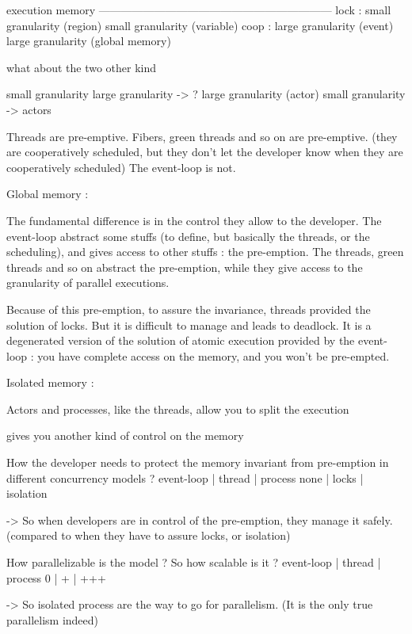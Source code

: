           execution                      memory
        ---------------------------------------------------------------
lock :    small granularity (region)     small granularity (variable)
coop :    large granularity (event)      large granularity (global memory)

what about the two other kind

          small granularity              large granularity     ->    ?
          large granularity (actor)      small granularity     ->  actors




Threads are pre-emptive.
Fibers, green threads and so on are pre-emptive. (they are cooperatively scheduled, but they don't let the developer know when they are cooperatively scheduled)
The event-loop is not.

Global memory :

The fundamental difference is in the control they allow to the developer.
The event-loop abstract some stuffs (to define, but basically the threads, or the scheduling), and gives access to other stuffs : the pre-emption.
The threads, green threads and so on abstract the pre-emption, while they give access to the granularity of parallel executions.

Because of this pre-emption, to assure the invariance, threads provided the solution of locks.
But it is difficult to manage and leads to deadlock.
It is a degenerated version of the solution of atomic execution provided by the event-loop : you have complete access on the memory, and you won't be pre-empted.

Isolated memory :

Actors and processes, like the threads, allow you to split the execution 

 gives you another kind of control on the memory






How the developer needs to protect the memory invariant from pre-emption in different concurrency models ?
  event-loop  |  thread  |   process
     none     |  locks   |  isolation

-> So when developers are in control of the pre-emption, they manage it safely.
(compared to when they have to assure locks, or isolation)


How parallelizable is the model ? So how scalable is it ?
  event-loop  |  thread  |   process
       0      |     +    |     +++

-> So isolated process are the way to go for parallelism.
(It is the only true parallelism indeed)

